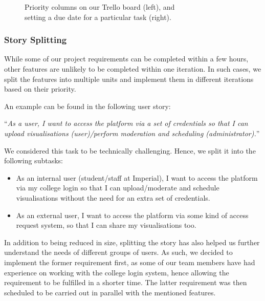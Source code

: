 ﻿\documentclass[a4paper, titlepage]{article}
\begin{document}
\begin{figure}[H]
  \begin{minipage}{0.49\textwidth}
  \end{minipage}
  \begin{minipage}{0.49\textwidth}
  \end{minipage}
  \caption{Priority columns on our Trello board (left), and \\ setting a due date for a particular task (right).}
  \label{fig:trello}
\end{figure}

\subsubsection{Story Splitting}

While some of our project requirements can be completed within a few hours, other features are unlikely to be completed within one iteration. In such cases, we split the features into multiple units and implement them in different iterations based on their priority.

An example can be found in the following user story:
\begin{center}
``\textit{As a user, I want to access the platform via a set of credentials so that I can upload visualisations (user)/perform moderation and scheduling (administrator).}'' \\
\end{center}

We considered this task to be technically challenging. Hence, we split it into the following subtasks:

\begin{itemize}

  \item As an internal user (student/staff at Imperial), I want to access the platform via my college login so that I can upload/moderate and schedule visualisations without the need for an extra set of credentials.

  \item As an external user, I want to access the platform via some kind of access request system, so that I can share my visualisations too.

\end{itemize}

In addition to being reduced in size, splitting the story has also helped us further understand the needs of different groups of users. As such, we decided to implement the former requirement first, as some of our team members have had experience on working with the college login system, hence allowing the requirement to be fulfilled in a shorter time. The latter requirement was then scheduled to be carried out in parallel with the mentioned features.
\end{document}
